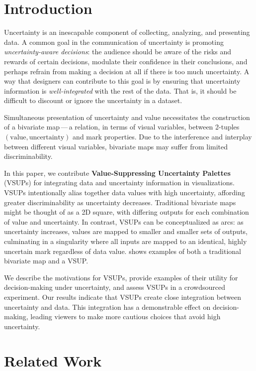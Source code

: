 \section{Introduction}
\exampleFig

Uncertainty is an inescapable component of collecting, analyzing, and presenting data. A common goal in the communication of uncertainty is promoting \emph{uncertainty-aware decisions}: the audience should be aware of the risks and rewards of certain decisions, modulate their confidence in their conclusions, and perhaps refrain from making a decision at all if there is too much uncertainty.  A way that designers can contribute to this goal is by ensuring that uncertainty information is \emph{well-integrated} with the rest of the data. That is, it should be difficult to discount or ignore the uncertainty in a dataset.

Simultaneous presentation of uncertainty and value necessitates the construction of a bivariate map\,---\,a relation, in terms of visual variables, between 2-tuples $(\text{value}, \text{uncertainty})$ and mark properties. Due to the interference and interplay between different visual variables, bivariate maps may suffer from limited discriminability.

In this paper, we contribute \textbf{Value-Suppressing Uncertainty Palettes} (VSUPs) for integrating data and uncertainty information in visualizations.
VSUPs intentionally alias together data values with high uncertainty, affording greater discriminability as uncertainty decreases. Traditional bivariate maps might be thought of as a 2D square, with differing outputs for each combination of value and uncertainty. In contrast, VSUPs can be conceptualized as arcs: as uncertainty increases, values are mapped to smaller and smaller sets of outputs, culminating in a singularity where all inputs are mapped to an identical, highly uncertain mark regardless of data value.  shows examples of both a traditional bivariate map and a VSUP.

We describe the motivations for VSUPs, provide examples of their utility for decision-making under uncertainty, and assess VSUPs in a crowdsourced experiment. Our results indicate that VSUPs create close integration between uncertainty and data. This integration has a demonstrable effect on decision-making, leading viewers to make more cautious choices that avoid high uncertainty.

\section{Related Work}

